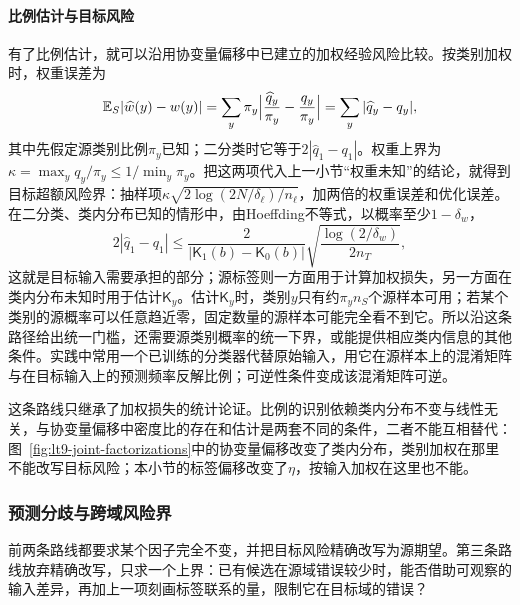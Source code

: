 \paragraph{比例估计与目标风险}
有了比例估计，就可以沿用协变量偏移中已建立的加权经验风险比较。按类别加权时，权重误差为
\[
 \mathbb E_S|\widehat w(y)-w(y)|=\sum_y\pi_y\Bigl|\frac{\widehat q_y}{\pi_y}-\frac{q_y}{\pi_y}\Bigr|
 =\sum_y|\widehat q_y-q_y| ,
\]
其中先假定源类别比例$\pi_y$已知；二分类时它等于$2|\widehat q_1-q_1|$。权重上界为$\kappa=\max_yq_y/\pi_y\leq1/\min_y\pi_y$。把这两项代入上一小节“权重未知”的结论，就得到目标超额风险界：抽样项$\kappa\sqrt{2\log(2N/\delta_\ell)/n_\ell}$，加两倍的权重误差和优化误差。在二分类、类内分布已知的情形中，由Hoeffding不等式，以概率至少$1-\delta_w$，
\[
 2|\widehat q_1-q_1|\leq\frac{2}{|\mathsf K_1(b)-\mathsf K_0(b)|}\sqrt{\frac{\log(2/\delta_w)}{2n_T}} ,
\]
这就是目标输入需要承担的部分；源标签则一方面用于计算加权损失，另一方面在类内分布未知时用于估计$\mathsf K_y$。估计$\mathsf K_y$时，类别$y$只有约$\pi_yn_S$个源样本可用；若某个类别的源概率可以任意趋近零，固定数量的源样本可能完全看不到它。所以沿这条路径给出统一门槛，还需要源类别概率的统一下界，或能提供相应类内信息的其他条件。实践中常用一个已训练的分类器代替原始输入，用它在源样本上的混淆矩阵与在目标输入上的预测频率反解比例；可逆性条件变成该混淆矩阵可逆。

这条路线只继承了加权损失的统计论证。比例的识别依赖类内分布不变与线性无关，与协变量偏移中密度比的存在和估计是两套不同的条件，二者不能互相替代：图~\ref{fig:lt9-joint-factorizations}中的协变量偏移改变了类内分布，类别加权在那里不能改写目标风险；本小节的标签偏移改变了$\eta$，按输入加权在这里也不能。

\subsubsection{预测分歧与跨域风险界}
\label{sec:adaptation-divergence}

前两条路线都要求某个因子完全不变，并把目标风险精确改写为源期望。第三条路线放弃精确改写，只求一个上界：已有候选在源域错误较少时，能否借助可观察的输入差异，再加上一项刻画标签联系的量，限制它在目标域的错误？

